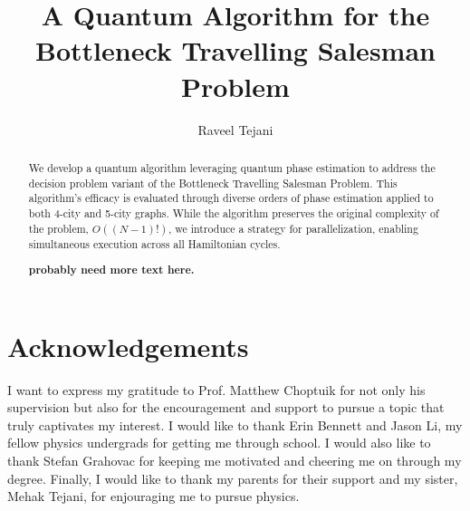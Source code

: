 \documentclass[msc,oneside]{ubcthesis}
\title{A Quantum Algorithm for the Bottleneck Travelling Salesman Problem}
\author{Raveel Tejani}
\begin{document}
	
	
	\frontmatter

	\maketitle               
	

	\clearpage
	\begin{abstract}                %
%		
		
		We develop a quantum algorithm leveraging quantum phase estimation to address the decision problem variant of the Bottleneck Travelling Salesman Problem. This algorithm's efficacy is evaluated through diverse orders of phase estimation applied to both 4-city and 5-city graphs. While the algorithm preserves the original complexity of the problem, $O((N-1)!)$, we introduce a strategy for parallelization, enabling simultaneous execution across all Hamiltonian cycles.
		
		\textbf{probably need more text here.}
	\end{abstract}
	
	
	\tableofcontents %
	\listoftables                   %
	\listoffigures                  %

	
	\chapter{Acknowledgements} 
	
	
	I want to express my gratitude to Prof. Matthew Choptuik for not only his supervision but also for the encouragement and support to pursue a topic that truly captivates my interest. I would like to thank Erin Bennett and Jason Li, my fellow physics undergrads for getting me through school. I would also like to thank Stefan Grahovac for keeping me motivated  and cheering me on through my degree. Finally, I would like to thank my parents for their support and my sister, Mehak Tejani, for enjouraging me to pursue physics.
	
\end{document}
